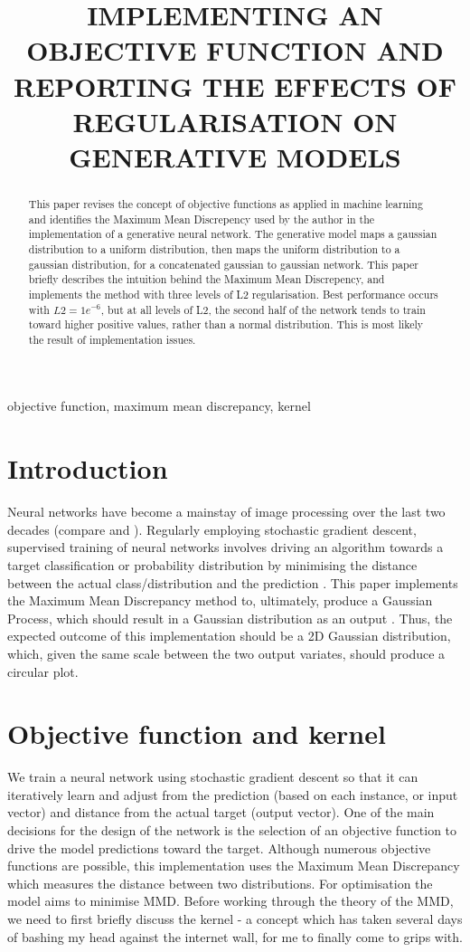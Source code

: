 \documentclass{article}
\title{IMPLEMENTING AN OBJECTIVE FUNCTION AND REPORTING THE EFFECTS OF REGULARISATION ON GENERATIVE MODELS}
\begin{document}
%
\maketitle
%
\begin{abstract}
This paper revises the concept of objective functions as applied in machine learning and identifies the Maximum Mean Discrepency used by the author in the implementation of a generative neural network.  The generative model maps a gaussian distribution to a uniform distribution, then maps the uniform distribution to a gaussian distribution, for a concatenated gaussian to gaussian network.  This paper briefly describes the intuition behind the Maximum Mean Discrepency, and implements the method with three levels of L2 regularisation.  Best performance occurs with $L2 = 1e^{-6}$, but at all levels of L2, the second half of the network tends to train toward higher positive values, rather than a normal distribution.  This is most likely the result of implementation issues.  
\end{abstract}
%
\begin{keywords}
objective function, maximum mean discrepancy, kernel
\end{keywords}
%
\section{Introduction}
\label{sec:intro}
%
Neural networks have become a mainstay of image processing over the last two decades (compare \cite{parisi1998car} and \cite{naranjo2020review}).  Regularly employing stochastic gradient descent, supervised training of neural networks involves driving an algorithm towards a target classification or probability distribution by minimising the distance between the actual class/distribution and the prediction \cite{samek2021explaining}.  This paper implements the Maximum Mean Discrepancy method to, ultimately, produce a Gaussian Process, which should result in a Gaussian distribution as an output \cite{Rasmussen2004}.  Thus, the expected outcome of this implementation should be a 2D Gaussian distribution, which, given the same scale between the two output variates, should produce a circular plot.    

\section{Objective function and kernel}
\label{sec:format}

We train a neural network using stochastic gradient descent so that it can iteratively learn and adjust from the prediction (based on each instance, or input vector) and distance from the actual target (output vector).  One of the main decisions for the design of the network is the selection of an objective function to drive the model predictions toward the target.  Although numerous objective functions are possible, this implementation uses the Maximum Mean Discrepancy which measures the distance between two distributions.  For optimisation the model aims to minimise MMD.  Before working through the theory of the MMD, we need to first briefly discuss the kernel - a concept which has taken several days of bashing my head against the internet wall, for me to finally come to grips with.  
\end{document}

